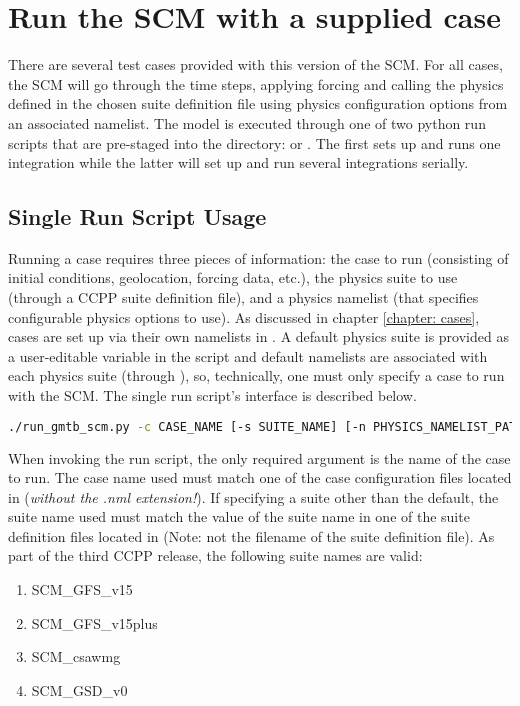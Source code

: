 \section{Run the SCM with a supplied case}
There are several test cases provided with this version of the SCM. For all cases, the SCM will go through the time steps, applying forcing and calling the physics defined in the chosen suite definition file using physics configuration options from an associated namelist. The model is executed through one of two python run scripts that are pre-staged into the  directory:  or . The first sets up and runs one integration while the latter will set up and run several integrations serially. 

\subsection{Single Run Script Usage}
Running a case requires three pieces of information: the case to run (consisting of initial conditions, geolocation, forcing data, etc.), the physics suite to use (through a CCPP suite definition file), and a physics namelist (that specifies configurable physics options to use). As discussed in chapter \ref{chapter: cases}, cases are set up via their own namelists in . A default physics suite is provided as a user-editable variable in the script and default namelists are associated with each physics suite (through ), so, technically, one must only specify a case to run with the SCM. The single run script's interface is described below.

\begin{lstlisting}[language=bash]
./run_gmtb_scm.py -c CASE_NAME [-s SUITE_NAME] [-n PHYSICS_NAMELIST_PATH] [-g]
\end{lstlisting}

When invoking the run script, the only required argument is the name of the case to run. The case name used must match one of the case configuration files located in  (\emph{without the .nml extension!}). If specifying a suite other than the default, the suite name used must match the value of the suite name in one of the suite definition files located in  (Note: not the filename of the suite definition file). As part of the third CCPP release, the following suite names are valid:
\begin{enumerate}
\item SCM\_GFS\_v15
\item SCM\_GFS\_v15plus
\item SCM\_csawmg
\item SCM\_GSD\_v0
\end{enumerate}

